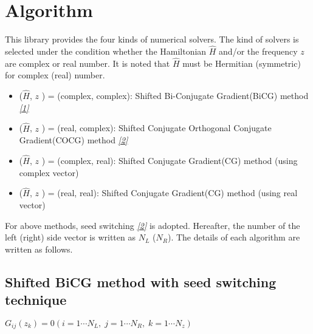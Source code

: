 \documentclass[letterpaper,10pt,dvipdfmx,openany]{sphinxmanual}
\begin{document}
\chapter{Algorithm}
\label{komega_algorithm_en::doc}\label{komega_algorithm_en:algorithm}
This library provides the four kinds of numerical solvers.
The kind of solvers is selected under the condition whether the Hamiltonian
\({\hat H}\) and/or the frequency \(z\) are complex or real number.
It is noted that \({\hat H}\) must be Hermitian (symmetric)
for complex (real) number.
\begin{itemize}
\item {} 
(\({\hat H}\), \(z\) ) = (complex, complex):
Shifted Bi-Conjugate Gradient(BiCG) method {\hyperref[komega_ref_en:ref]{\emph{{[}1{]}}}}

\item {} 
(\({\hat H}\), \(z\) ) = (real, complex):
Shifted Conjugate Orthogonal Conjugate Gradient(COCG) method {\hyperref[komega_ref_en:ref]{\emph{{[}2{]}}}}

\item {} 
(\({\hat H}\), \(z\) ) = (complex, real):
Shifted Conjugate Gradient(CG) method (using complex vector)

\item {} 
(\({\hat H}\), \(z\) ) = (real, real):
Shifted Conjugate Gradient(CG) method (using real vector)

\end{itemize}

For above methods, seed switching {\hyperref[komega_ref_en:ref]{\emph{{[}2{]}}}} is adopted.
Hereafter, the number of the left (right) side vector is
written as \(N_L\) (\(N_R\)).
The details of each algorithm are written as follows.


\section{Shifted BiCG method with seed switching technique}
\label{komega_algorithm_en:shifted-bicg-method-with-seed-switching-technique}
\(G_{i j}(z_k) = 0 (i=1 \cdots N_L,\; j = 1 \cdots N_R,\; k=1 \cdots N_z)\)
\end{document}
